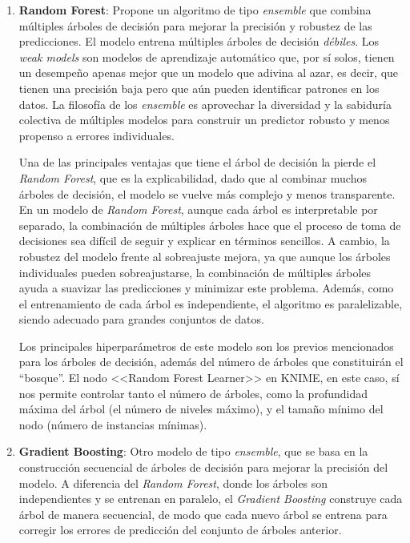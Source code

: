 \begin{enumerate}

    \item \textbf{Random Forest}: Propone un algoritmo de tipo \textit{ensemble} que combina múltiples árboles de decisión para mejorar la precisión y robustez de las predicciones. El modelo entrena múltiples árboles de decisión \textit{débiles}. Los \textit{weak models} son modelos de aprendizaje automático que, por sí solos, tienen un desempeño apenas mejor que un modelo que adivina al azar, es decir, que tienen una precisión baja pero que aún pueden identificar patrones en los datos. La filosofía de los \textit{ensemble} es aprovechar la diversidad y la sabiduría colectiva de múltiples modelos para construir un predictor robusto y menos propenso a errores individuales.

    Una de las principales ventajas que tiene el árbol de decisión la pierde el \textit{Random Forest}, que es la explicabilidad, dado que al combinar muchos árboles de decisión, el modelo se vuelve más complejo y menos transparente. En un modelo de \textit{Random Forest}, aunque cada árbol es interpretable por separado, la combinación de múltiples árboles hace que el proceso de toma de decisiones sea difícil de seguir y explicar en términos sencillos. A cambio, la robustez del modelo frente al sobreajuste mejora, ya que aunque los árboles individuales pueden sobreajustarse, la combinación de múltiples árboles ayuda a suavizar las predicciones y minimizar este problema. Además, como el entrenamiento de cada árbol es independiente, el algoritmo es paralelizable, siendo adecuado para grandes conjuntos de datos.

    Los principales hiperparámetros de este modelo son los previos mencionados para los árboles de decisión, además del número de árboles que constituirán el ``bosque''. El nodo <<Random Forest Learner>> en KNIME, en este caso, sí nos permite controlar tanto el número de árboles, como la profundidad máxima del árbol (el número de niveles máximo), y el tamaño mínimo del nodo (número de instancias mínimas). 


    \item \textbf{Gradient Boosting}: Otro modelo de tipo \textit{ensemble}, que se basa en la construcción secuencial de árboles de decisión para mejorar la precisión del modelo. A diferencia del \textit{Random Forest}, donde los árboles son independientes y se entrenan en paralelo, el \textit{Gradient Boosting} construye cada árbol de manera secuencial, de modo que cada nuevo árbol se entrena para corregir los errores de predicción del conjunto de árboles anterior.


\end{enumerate}
